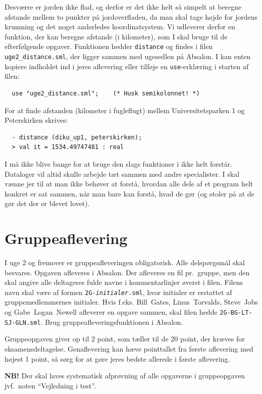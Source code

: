 \documentclass[a4paper,12pt]{article}
\begin{document}
Desværre er jorden ikke flad, og derfor er det ikke helt så simpelt at
beregne afstande mellem to punkter på jordoverfladen, da man skal tage
højde for jordens krumning og det noget anderledes koordinatsystem.  Vi
udleverer derfor en funktion, der kan beregne afstande (i kilometer),
som I skal bruge til de efterfølgende opgaver. Funktionen hedder
\verb|distance| og findes i filen \texttt{uge2\_distance.sml}, der
ligger sammen med ugesedlen på Absalon. I kan enten kopiere indholdet
ind i jeres aflevering eller tilføje en \verb|use|-erklæring i starten
af filen:
\begin{verbatim}
  use "uge2_distance.sml";    (* Husk semikolonnet! *)
\end{verbatim}
For at finde afstanden (kilometer i fugleflugt) mellem
Universitetsparken 1 og Peterskirken skrives:
\begin{verbatim}
  - distance (diku_up1, peterskirken);
  > val it = 1534.49747481 : real
\end{verbatim}
I må ikke blive bange for at bruge den slags funktioner i ikke helt
forstår. Dataloger vil altid skulle arbejde tæt sammen med andre
specialister. I skal vænne jer til at man ikke behøver at forstå,
hvordan alle dele af et program helt konkret er sat sammen, når man
bare kan forstå, hvad de gør (og stoler på at de gør det der er blevet
lovet).

\section{Gruppeaflevering}
\label{sec:gruppeaflevering}
I uge 2 og fremover er gruppeafleveringen obligatorisk.  Alle
delspørgsmål skal besvares.  Opgaven afleveres i Absalon.  Der
afleveres en fil pr.\ gruppe, men den skal angive alle deltageres
fulde navne i kommentarlinjer øverst i filen. Filens navn skal være af
formen \texttt{2G-\textit{initialer}.sml}, hvor initialer er erstattet
af gruppemedlemmernes initialer. Hvis f.eks. Bill~Gates,
Linus~Torvalds, Steve~Jobs og Gabe~Logan~Newell afleverer en opgave
sammen, skal filen hedde \texttt{2G-BG-LT-SJ-GLN.sml}. Brug
gruppeafleveringsfunktionen i Absalon.

Gruppeopgaven giver op til 2 point, som tæller til de 20 point, der
kræves for eksamensdeltagelse.  Genaflevering kan hæve pointtallet fra
første aflevering med højest 1 point, så sørg for at gøre jeres bedste
allerede i første aflevering.

\textbf{NB!} Der skal laves systematisk afprøvning af alle opgaverne i
gruppeopgaven jvf.\ noten ``Vejledning i test''.
\end{document}
